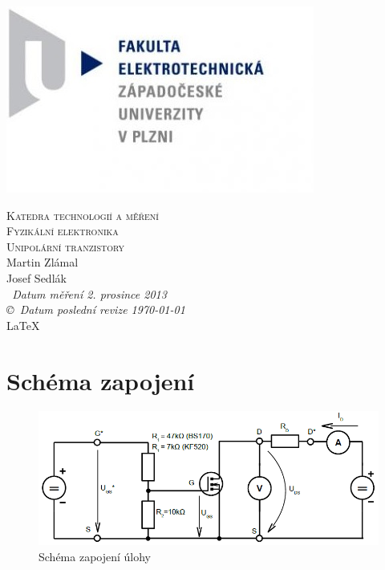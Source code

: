 \documentclass[12pt]{article} %
\newcommand{\bigsize}{\fontsize{35pt}{20pt}\selectfont}
\begin{document}
\begin{titlepage}
	\includegraphics[scale=0.7]{logo.jpg}
	\vspace*{\fill}
	\begin{center}
		\textsc{\LARGE Katedra technologií a měření}\\[0.3cm]
		\textsc{\LARGE \bigsize Fyzikální elektronika}\\[0.3cm]
		\textsc{\LARGE Unipolární tranzistory}\\[1cm]
		Martin Zlámal \\
		Josef Sedlák \\[1cm]
		{\small\em \ Datum měření 2. prosince 2013 } \\
		{\small\em \copyright \ Datum poslední revize \today } \\
		\LaTeX
	\end{center}
	\vspace*{\fill}
\end{titlepage}
\tableofcontents
\listoffigures
\listoftables
\newpage

\section{Schéma zapojení}
\begin{figure}[H]
\includegraphics[scale=0.7]{schema.png}
\caption{Schéma zapojení úlohy}
\end{figure}
\end{document}

